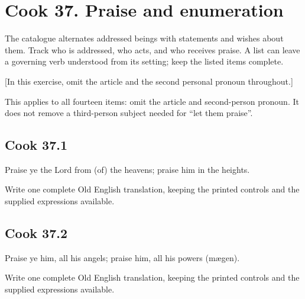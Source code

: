 \section*{Cook 37. Praise and enumeration}

The catalogue alternates addressed beings with statements and wishes about them. Track who is addressed, who acts, and who receives praise. A list can leave a governing verb understood from its setting; keep the listed items complete.

[In this exercise, omit the article and the second personal pronoun throughout.]

This applies to all fourteen items: omit the article and second-person pronoun. It does not remove a third-person subject needed for “let them praise”.

\par\begin{minipage}{\linewidth}\raggedright
\subsection*{Cook 37.1}

Praise ye the Lord from (of) the heavens; praise him in the heights.

Write one complete Old English translation, keeping the printed controls and the supplied expressions available.

\end{minipage}\par\addvspace{4pt}

\par\begin{minipage}{\linewidth}\raggedright
\subsection*{Cook 37.2}

Praise ye him, all his angels; praise him, all his powers (mægen).

Write one complete Old English translation, keeping the printed controls and the supplied expressions available.

\end{minipage}\par\addvspace{4pt}

